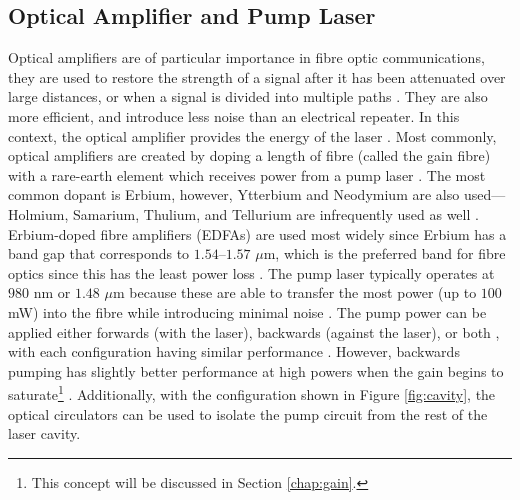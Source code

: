 \subsection{Optical Amplifier and Pump Laser}
Optical amplifiers are of particular importance in fibre optic communications, they are used to restore the strength of a signal after it has been attenuated over large distances, or when a signal is divided into multiple paths \cite{alazzawi, starodoumov}. They are also more efficient, and introduce less noise than an electrical repeater. In this context, the optical amplifier provides the energy of the laser \cite{alazzawi}. Most commonly, optical amplifiers are created by doping a length of fibre (called the gain fibre) with a rare-earth element which receives power from a pump laser \cite{agrawal2002, alazzawi, starodoumov}. The most common dopant is Erbium, however, Ytterbium and Neodymium are also used---Holmium, Samarium, Thulium, and Tellurium are infrequently used as well \cite{agrawal2002}. \\

Erbium-doped fibre amplifiers (EDFAs) are used most widely since Erbium has a band gap that corresponds to $1.54$--$1.57$ $\mu$m, which is the preferred band for fibre optics since this has the least power loss \cite{agrawal2002, alazzawi, starodoumov}. The pump laser typically operates at $980$ nm or $1.48$ $\mu$m because these are able to transfer the most power (up to $100$ mW) into the fibre while introducing minimal noise \cite{agrawal2002, alazzawi, becker, starodoumov}. The pump power can be applied either forwards (with the laser), backwards (against the laser), or both \cite{alazzawi}, with each configuration having similar performance \cite{agrawal2002}. However, backwards pumping has slightly better performance at high powers when the gain begins to saturate\footnote{This concept will be discussed in Section \ref{chap:gain}.} \cite{agrawal2002}. Additionally, with the configuration shown in Figure \ref{fig:cavity}, the optical circulators can be used to isolate the pump circuit from the rest of the laser cavity. \\

